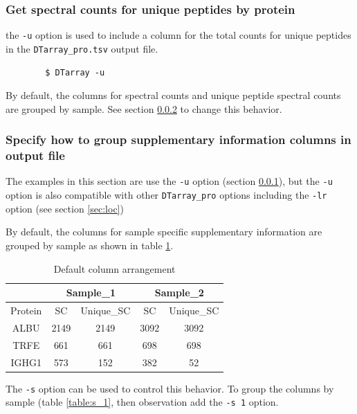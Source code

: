 \documentclass[12pt]{article}
\begin{document}
	\subsubsection{Get spectral counts for unique peptides by protein} \label{sec:unique_sc}
	
	the \texttt{-u} option is used to include a column for the total counts for unique peptides in the \texttt{DTarray\_pro.tsv} output file.
	
	\begin{lstlisting}
		$ DTarray -u
	\end{lstlisting}
	
	By default, the columns for spectral counts and unique peptide spectral counts are grouped by sample.  See section \ref{sec:sup_info} to change this behavior.  
	
	\subsubsection{Specify how to group supplementary information columns in output file} \label{sec:sup_info}
	
	The examples in this section are use the \texttt{-u} option (section \ref{sec:unique_sc}), but the \texttt{-u} option is also compatible with other \texttt{DTarray\_pro} options including the \texttt{-lr} option (see section \ref{sec:loc})
	
	\bigskip
	\noindent
	By default, the columns for sample specific supplementary information are grouped by sample as shown in table \ref{table:s_0}.  
	
	\bigskip
	\begin{table}[h!]
		\centering
		\footnotesize
		\begin{tabular}{ccccc}
			\toprule
			& \multicolumn{2}{c}{Sample\_1}
			& \multicolumn{2}{c}{Sample\_2} \\
			\midrule
			Protein & SC & Unique\_SC & SC & Unique\_SC \\ 
			\midrule
			ALBU & 2149 & 2149 & 3092 & 3092 \\
			TRFE & 661 & 661 & 698 & 698 \\ 
			IGHG1 & 573 & 152 & 382 & 52 \\ 
			\toprule
		\end{tabular}
		\caption{Default column arrangement}
		\label{table:s_0}
	\end{table}
	
	\noindent
	The \texttt{-s} option can be used to control this behavior. To group the columns by sample (table \ref{table:s_1}, then observation add the \texttt{-s 1} option.
	
\end{document}
